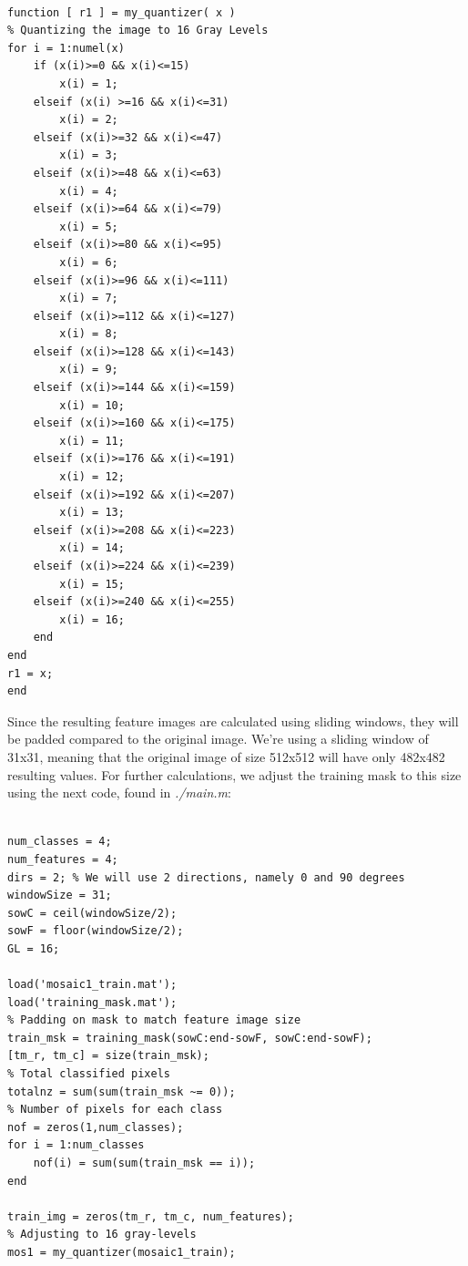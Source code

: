 \documentclass[a4paper, article, oneside, UKenglish]{memoir}
\newcommand{\0}{\mathbf{0}}
\newcommand{\1}{\mathbf{1}}
\begin{document}
\lstset{language=Matlab}
\begin{lstlisting}[frame=single]  % Inicia el bloque de código

function [ r1 ] = my_quantizer( x )
% Quantizing the image to 16 Gray Levels
for i = 1:numel(x)
    if (x(i)>=0 && x(i)<=15)
        x(i) = 1;
    elseif (x(i) >=16 && x(i)<=31)
        x(i) = 2;
    elseif (x(i)>=32 && x(i)<=47)
        x(i) = 3;
    elseif (x(i)>=48 && x(i)<=63)
        x(i) = 4;
    elseif (x(i)>=64 && x(i)<=79)
        x(i) = 5;
    elseif (x(i)>=80 && x(i)<=95)
        x(i) = 6;
    elseif (x(i)>=96 && x(i)<=111)
        x(i) = 7;
    elseif (x(i)>=112 && x(i)<=127)
        x(i) = 8;
    elseif (x(i)>=128 && x(i)<=143)
        x(i) = 9;
    elseif (x(i)>=144 && x(i)<=159)
        x(i) = 10;
    elseif (x(i)>=160 && x(i)<=175)
        x(i) = 11;
    elseif (x(i)>=176 && x(i)<=191)
        x(i) = 12;
    elseif (x(i)>=192 && x(i)<=207)
        x(i) = 13;
    elseif (x(i)>=208 && x(i)<=223)
        x(i) = 14;
    elseif (x(i)>=224 && x(i)<=239)
        x(i) = 15;
    elseif (x(i)>=240 && x(i)<=255)
        x(i) = 16;
    end
end
r1 = x;
end

\end{lstlisting}

Since the resulting feature images are calculated using sliding windows, they will be padded compared to the original image. We're using a sliding window of 31x31, meaning that the original image of size 512x512 will have only 482x482 resulting values. For further calculations, we adjust the training mask to this size using the next code, found in \textit{./main.m}:

\begin{lstlisting}[basicstyle=\small, frame=single]  % Inicia el bloque de código

num_classes = 4;
num_features = 4; 
dirs = 2; % We will use 2 directions, namely 0 and 90 degrees
windowSize = 31;
sowC = ceil(windowSize/2);
sowF = floor(windowSize/2);
GL = 16;

load('mosaic1_train.mat');
load('training_mask.mat');
% Padding on mask to match feature image size
train_msk = training_mask(sowC:end-sowF, sowC:end-sowF);
[tm_r, tm_c] = size(train_msk);
% Total classified pixels
totalnz = sum(sum(train_msk ~= 0));
% Number of pixels for each class
nof = zeros(1,num_classes);
for i = 1:num_classes
    nof(i) = sum(sum(train_msk == i));
end

train_img = zeros(tm_r, tm_c, num_features);
% Adjusting to 16 gray-levels
mos1 = my_quantizer(mosaic1_train);

\end{lstlisting}
\end{document}
